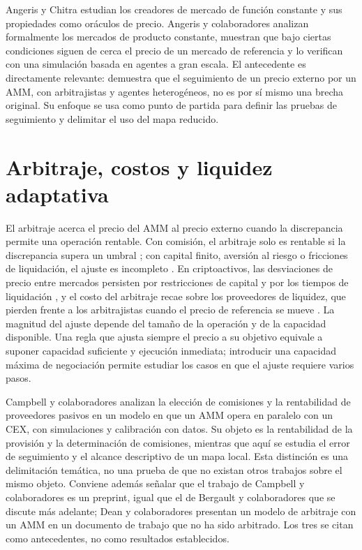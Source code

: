 Angeris y Chitra \cite{angeris2020cfmm} estudian los creadores de mercado de función constante y sus propiedades como oráculos de precio. Angeris y colaboradores \cite{angeris2020uniswap} analizan formalmente los mercados de producto constante, muestran que bajo ciertas condiciones siguen de cerca el precio de un mercado de referencia y lo verifican con una simulación basada en agentes a gran escala. El antecedente es directamente relevante: demuestra que el seguimiento de un precio externo por un AMM, con arbitrajistas y agentes heterogéneos, no es por sí mismo una brecha original. Su enfoque se usa como punto de partida para definir las pruebas de seguimiento y delimitar el uso del mapa reducido.

\section{Arbitraje, costos y liquidez adaptativa}

El arbitraje acerca el precio del AMM al precio externo cuando la discrepancia permite una operación rentable. Con comisión, el arbitraje solo es rentable si la discrepancia supera un umbral \cite{milionis2025fees}; con capital finito, aversión al riesgo o fricciones de liquidación, el ajuste es incompleto \cite{shleifer1997limits}. En criptoactivos, las desviaciones de precio entre mercados persisten por restricciones de capital y por los tiempos de liquidación \cite{makarov2020trading,hautsch2024building}, y el costo del arbitraje recae sobre los proveedores de liquidez, que pierden frente a los arbitrajistas cuando el precio de referencia se mueve \cite{milionis2022lvr}. La magnitud del ajuste depende del tamaño de la operación y de la capacidad disponible. Una regla que ajusta siempre el precio a su objetivo equivale a suponer capacidad suficiente y ejecución inmediata; introducir una capacidad máxima de negociación permite estudiar los casos en que el ajuste requiere varios pasos.

Campbell y colaboradores \cite{campbell2025optimal} analizan la elección de comisiones y la rentabilidad de proveedores pasivos en un modelo en que un AMM opera en paralelo con un CEX, con simulaciones y calibración con datos. Su objeto es la rentabilidad de la provisión y la determinación de comisiones, mientras que aquí se estudia el error de seguimiento y el alcance descriptivo de un mapa local. Esta distinción es una delimitación temática, no una prueba de que no existan otros trabajos sobre el mismo objeto. Conviene además señalar que el trabajo de Campbell y colaboradores es un preprint, igual que el de Bergault y colaboradores \cite{bergault2025exit} que se discute más adelante; Dean y colaboradores \cite{dean2022arbitrage} presentan un modelo de arbitraje con un AMM en un documento de trabajo que no ha sido arbitrado. Los tres se citan como antecedentes, no como resultados establecidos.

